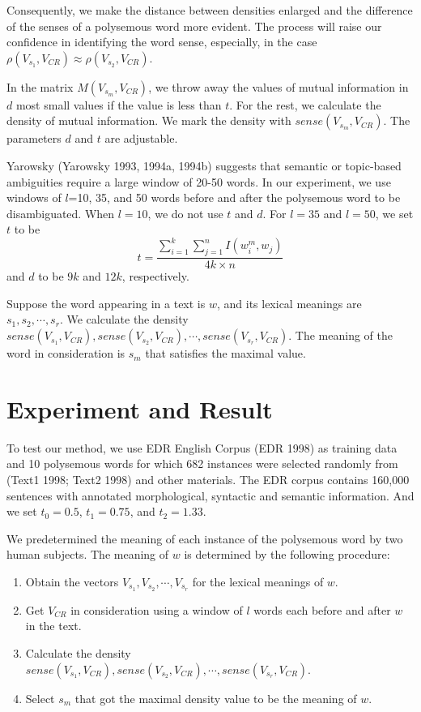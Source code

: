 Consequently, we make the distance between densities enlarged and the difference 
of the senses of a polysemous word more evident.  The process will raise our 
confidence in identifying the word sense, especially, in the 
case $\rho (V_{s_1}, V_{CR}) \approx \rho (V_{s_2}, V_{CR})$.

In the matrix $M(V_{s_m}, V_{CR})$, we throw away the values of mutual information in $d$ most 
small values if the value is less than $t$.  For the rest, we calculate the density 
of mutual information.  We mark the density with $sense(V_{s_m}, V_{CR})$.  
The parameters $d$ and $t$ are adjustable.

Yarowsky (Yarowsky 1993, 1994a, 1994b) suggests that semantic or topic-based
 ambiguities require a 
large window of 20-50 words.  In our experiment, we use windows of $l$=10, 35, and 50 
words before and after the polysemous word to be disambiguated.  When $l=10$, we do 
not use $t$ and $d$.  For $l=35$ and $l=50$, we set $t$ to be
\[t=\frac{\sum_{i=1}^k \sum_{j=1}^n I(w_i^m, w_j)}{4k \times n}
\]
and $d$ to be $9k$ and $12k$, respectively.

Suppose the word appearing in a text is $w$, and its lexical meanings 
are $s_1, s_2, \cdots, s_r$.  We calculate the
 density $sense(V_{s_1},V_{CR}), sense(V_{s_2},V_{CR}), \cdots, sense(V_{s_r},V_{CR})$.
  The meaning of the word in consideration is $s_m$ that satisfies the maximal value.

\section{Experiment and Result}

To test our method, we use EDR English Corpus (EDR 1998) as training data and 10 polysemous
 words for which 682 instances were selected randomly from (Text1 1998; Text2 1998) and other 
materials.  The EDR corpus contains 160,000 sentences with annotated morphological, 
syntactic and semantic information.  And we set $t_0=0.5$, $t_1=0.75$, and $t_2=1.33$.

We predetermined the meaning of each instance of the polysemous word by two human subjects.  
The meaning of $w$ is determined by the following procedure:

\begin{enumerate}
\item Obtain the vectors $V_{s_1}, V_{s_2}, \cdots, V_{s_r}$ for the lexical meanings of $w$.
\item Get $V_{CR}$ in consideration using a window of $l$ words each before and after $w$ in the text. 
\item Calculate the density $sense(V_{s_1},V_{CR}), sense(V_{s_2},V_{CR}), \cdots, sense(V_{s_r},V_{CR})$.
\item Select $s_m$ that got the maximal density value to be the meaning of $w$.
\end{enumerate}

